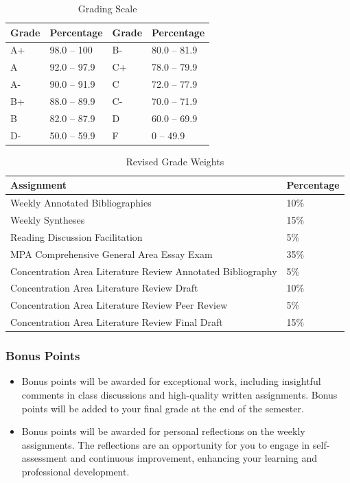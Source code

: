 \documentclass[12pt, letterpaper]{article}
\begin{document}
\begin{table}[h]
\centering
\caption{Grading Scale}
\begin{tabular}{llll}
\toprule
\textbf{Grade} & \textbf{Percentage} & \textbf{Grade} & \textbf{Percentage} \\
\midrule
A+ & 98.0 -- 100 & B- & 80.0 -- 81.9\\
A & 92.0 -- 97.9 & C+ & 78.0 -- 79.9\\
A- & 90.0 -- 91.9 & C & 72.0 -- 77.9\\
B+ & 88.0 -- 89.9 & C- & 70.0 -- 71.9\\
B & 82.0 -- 87.9 & D & 60.0 -- 69.9\\
D- & 50.0 -- 59.9 & F & 0 -- 49.9\\

\bottomrule
\end{tabular}
\label{tab:grading-scale}
\end{table}

\begin{table}[h!]
    \centering
    \caption{Revised Grade Weights}
    \begin{tabular}{ll}
        \toprule
    \textbf{Assignment} & \textbf{Percentage} \\
    \midrule
    Weekly Annotated Bibliographies & 10\% \\
    Weekly Syntheses & 15\% \\
    Reading Discussion Facilitation & 5\% \\
    MPA Comprehensive General Area Essay Exam & 35\% \\
    Concentration Area Literature Review Annotated Bibliography & 5\% \\
    Concentration Area Literature Review Draft & 10\% \\
    Concentration Area Literature Review Peer Review & 5\% \\
    Concentration Area Literature Review Final Draft & 15\% \\
    \bottomrule
    \end{tabular}
    \label{tab:grade-weights}
    \end{table}
    
    \subsubsection*{Bonus Points}
    \begin{itemize}
        \item Bonus points will be awarded for exceptional work, including insightful comments in class discussions and high-quality written assignments. Bonus points will be added to your final grade at the end of the semester.
        \item Bonus points will be awarded for personal reflections on the weekly assignments. The reflections are an opportunity for you to engage in self-assessment and continuous improvement, enhancing your learning and professional development.
    \end{itemize}
    
\end{document}
